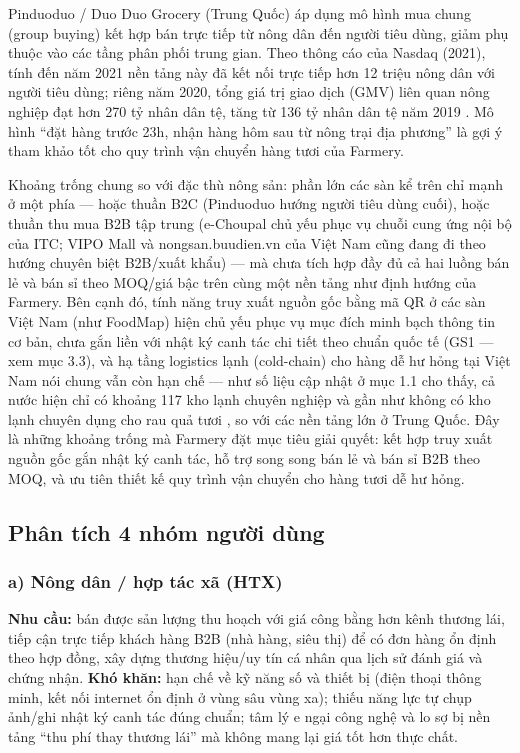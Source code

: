 Pinduoduo / Duo Duo Grocery (Trung Quốc) áp dụng mô hình mua chung (group buying) kết hợp bán trực tiếp từ nông dân đến người tiêu dùng, giảm phụ thuộc vào các tầng phân phối trung gian. Theo thông cáo của Nasdaq (2021), tính đến năm 2021 nền tảng này đã kết nối trực tiếp hơn 12 triệu nông dân với người tiêu dùng; riêng năm 2020, tổng giá trị giao dịch (GMV) liên quan nông nghiệp đạt hơn 270 tỷ nhân dân tệ, tăng từ 136 tỷ nhân dân tệ năm 2019 \cite{nasdaq_2021_pinduoduo}. Mô hình ``đặt hàng trước 23h, nhận hàng hôm sau từ nông trại địa phương'' là gợi ý tham khảo tốt cho quy trình vận chuyển hàng tươi của Farmery.

Khoảng trống chung so với đặc thù nông sản: phần lớn các sàn kể trên chỉ mạnh ở một phía --- hoặc thuần B2C (Pinduoduo hướng người tiêu dùng cuối), hoặc thuần thu mua B2B tập trung (e-Choupal chủ yếu phục vụ chuỗi cung ứng nội bộ của ITC; VIPO Mall và nongsan.buudien.vn của Việt Nam cũng đang đi theo hướng chuyên biệt B2B/xuất khẩu) --- mà chưa tích hợp đầy đủ cả hai luồng bán lẻ và bán sỉ theo MOQ/giá bậc trên cùng một nền tảng như định hướng của Farmery. Bên cạnh đó, tính năng truy xuất nguồn gốc bằng mã QR ở các sàn Việt Nam (như FoodMap) hiện chủ yếu phục vụ mục đích minh bạch thông tin cơ bản, chưa gắn liền với nhật ký canh tác chi tiết theo chuẩn quốc tế (GS1 --- xem mục 3.3), và hạ tầng logistics lạnh (cold-chain) cho hàng dễ hư hỏng tại Việt Nam nói chung vẫn còn hạn chế --- như số liệu cập nhật ở mục 1.1 cho thấy, cả nước hiện chỉ có khoảng 117 kho lạnh chuyên nghiệp và gần như không có kho lạnh chuyên dụng cho rau quả tươi \cite{tuoitre_2026}, so với các nền tảng lớn ở Trung Quốc. Đây là những khoảng trống mà Farmery đặt mục tiêu giải quyết: kết hợp truy xuất nguồn gốc gắn nhật ký canh tác, hỗ trợ song song bán lẻ và bán sỉ B2B theo MOQ, và ưu tiên thiết kế quy trình vận chuyển cho hàng tươi dễ hư hỏng.

\subsection{Phân tích 4 nhóm người dùng}

\subsubsection*{a) Nông dân / hợp tác xã (HTX)}
\textbf{Nhu cầu:} bán được sản lượng thu hoạch với giá công bằng hơn kênh thương lái, tiếp cận trực tiếp khách hàng B2B (nhà hàng, siêu thị) để có đơn hàng ổn định theo hợp đồng, xây dựng thương hiệu/uy tín cá nhân qua lịch sử đánh giá và chứng nhận. \textbf{Khó khăn:} hạn chế về kỹ năng số và thiết bị (điện thoại thông minh, kết nối internet ổn định ở vùng sâu vùng xa); thiếu năng lực tự chụp ảnh/ghi nhật ký canh tác đúng chuẩn; tâm lý e ngại công nghệ và lo sợ bị nền tảng ``thu phí thay thương lái'' mà không mang lại giá tốt hơn thực chất.

